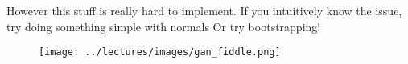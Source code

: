 \documentclass{tufte-handout}
\theoremstyle{break}
\begin{document}
 However this stuff is really hard to implement.
 If you intuitively know the issue, try doing something simple with normals
 Or try bootstrapping!

\begin{figure}
    \texttt{[image: ../lectures/images/gan\_fiddle.png]}
\end{figure}
      



\end{document}
